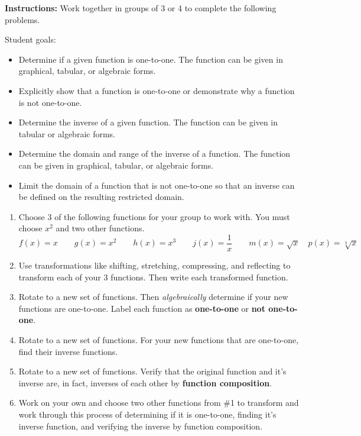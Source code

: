 

\noindent \textbf{Instructions:}  Work together in groups of  3 or 4 to complete the following problems.


Student goals:
\begin{itemize}
\item Determine if a given function is one-to-one. The function can
  be given in graphical, tabular, or algebraic forms.
\item Explicitly show that a function is one-to-one or demonstrate why
  a function is not one-to-one.
\item Determine the inverse of a given function. The function can be
  given in tabular or algebraic forms.
\item Determine the domain and range of the inverse of a function. The
  function can be given in graphical, tabular, or algebraic forms.
\item Limit the domain of a function that is not one-to-one so that an
  inverse can be defined on the resulting restricted domain.
\end{itemize}


\begin{enumerate}
\item Choose 3 of the following functions for your group to work with.  You must choose $x^2$ and two other functions.
$$f(x)=x \quad \quad g(x)=x^2 \quad \quad h(x)=x^3 \quad \quad j(x)=\frac{1}{x} \quad \quad m(x)=\sqrt{x}  \quad p(x)=\sqrt[3]{x}$$

\item Use transformations like shifting, stretching, compressing, and reflecting to transform each of your 3 functions.  Then write each transformed function.

\item Rotate to a new set of functions.  Then \emph{algebraically} determine if your new functions are one-to-one.  Label each function as \textbf{one-to-one} or \textbf{not one-to-one}.

\item Rotate to a new set of functions.  For your new functions that are one-to-one, find their inverse functions.  

\item Rotate to a new set of functions.  Verify that the original function and it's inverse are, in fact, inverses of each other by \textbf{function composition}.

\item Work on your own and choose two other functions from \#1 to transform and work through this process of determining if it is one-to-one, finding it's inverse function, and verifying the inverse by function composition.




\end{enumerate}




